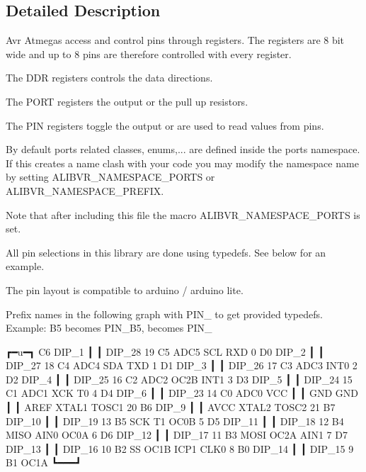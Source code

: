 \subsection{Detailed Description}
Avr Atmegas access and control pins through registers. The registers are 8 bit wide and up to 8 pins are therefore controlled with every register. 


\begin{DoxyItemize}
\item The D\+DR registers controls the data directions.
\item The P\+O\+RT registers the output or the pull up resistors.
\item The P\+IN registers toggle the output or are used to read values from pins.
\end{DoxyItemize}

By default ports related classes, enums,... are defined inside the {\ttfamily ports} namespace. If this creates a name clash with your code you may modify the namespace name by setting A\+L\+I\+B\+V\+R\+\_\+\+N\+A\+M\+E\+S\+P\+A\+C\+E\+\_\+\+P\+O\+R\+TS or A\+L\+I\+B\+V\+R\+\_\+\+N\+A\+M\+E\+S\+P\+A\+C\+E\+\_\+\+P\+R\+E\+F\+IX.

Note that after including this file the macro A\+L\+I\+B\+V\+R\+\_\+\+N\+A\+M\+E\+S\+P\+A\+C\+E\+\_\+\+P\+O\+R\+TS is set.

All pin selections in this library are done using {\ttfamily typedef}s. See below for an example.

The pin layout is compatible to arduino / arduino lite.

Prefix names in the following graph with {\ttfamily P\+I\+N\+\_\+} to get provided {\ttfamily typedef}s. Example\+: {\ttfamily B5} becomes {\ttfamily P\+I\+N\+\_\+\+B5}, {} becomes {\ttfamily P\+I\+N\+\_}


\begin{DoxyCode}
                                 ┏━u━┓
                     C6    DIP\_1 ┃   ┃ DIP\_28   19   C5   ADC5   SCL
RXD              0   D0    DIP\_2 ┃   ┃ DIP\_27   18   C4   ADC4   SDA
TXD              1   D1    DIP\_3 ┃   ┃ DIP\_26   17   C3   ADC3
        INT0     2   D2    DIP\_4 ┃   ┃ DIP\_25   16   C2   ADC2
OC2B    INT1     3   D3    DIP\_5 ┃   ┃ DIP\_24   15   C1   ADC1
XCK     T0       4   D4    DIP\_6 ┃   ┃ DIP\_23   14   C0   ADC0
                             VCC ┃   ┃ GND
                             GND ┃   ┃ AREF
XTAL1   TOSC1   20   B6    DIP\_9 ┃   ┃ AVCC
XTAL2   TOSC2   21   B7   DIP\_10 ┃   ┃ DIP\_19   13   B5   SCK
T1      OC0B     5   D5   DIP\_11 ┃   ┃ DIP\_18   12   B4   MISO
AIN0    OC0A     6   D6   DIP\_12 ┃   ┃ DIP\_17   11   B3   MOSI   OC2A
AIN1             7   D7   DIP\_13 ┃   ┃ DIP\_16   10   B2   SS     OC1B
ICP1    CLK0     8   B0   DIP\_14 ┃   ┃ DIP\_15    9   B1          OC1A
                                 ┗━━━┛
\end{DoxyCode}
 

